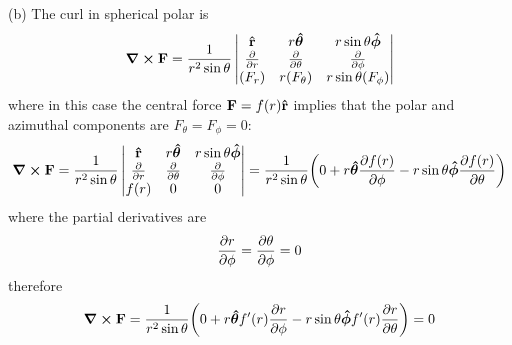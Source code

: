 \documentclass[../problems.tex]{subfiles}
\begin{document}
(b) The curl in spherical polar is
\begin{align*}
    \curl{\vb{F}} = \frac{1}{r^2 \sin\theta} \begin{vmatrix}
        \vu{r} & r \vu*{\theta} & r\sin\theta \vu*{\phi} \\
        \pdv{r} & \pdv{\theta} & \pdv{\phi} \\
        (F_r) & r(F_\theta) & r\sin\theta (F_\phi)
    \end{vmatrix}
\end{align*}
where in this case the central force $\vb{F} = f(r) \vu{r}$ implies that the polar and
azimuthal components are $F_\theta = F_\phi = 0$:
\begin{align*}
    \curl{\vb{F}} = \frac{1}{r^2 \sin\theta} \begin{vmatrix}
        \vu{r} & r \vu*{\theta} & r\sin\theta \vu*{\phi} \\
        \pdv{r} & \pdv{\theta} & \pdv{\phi} \\
        f(r) & 0 & 0
    \end{vmatrix}
    = \frac{1}{r^2\sin\theta} \quantity(0 + r \vu*{\theta} \pdv{f(r)}{\phi}
    - r\sin\theta \vu*{\phi} \pdv{f(r)}{\theta})
\end{align*}
where the partial derivatives are
\begin{align*}
    \pdv{r}{\phi} = \pdv{\theta}{\phi} = 0
\end{align*}
therefore
\begin{align*}
    \curl{\vb{F}} = \frac{1}{r^2\sin\theta} \quantity(0 + r \vu*{\theta} f'(r) \pdv{r}{\phi}
    - r\sin\theta \vu*{\phi} f'(r) \pdv{r}{\theta}) = 0
\end{align*}
\end{document}
